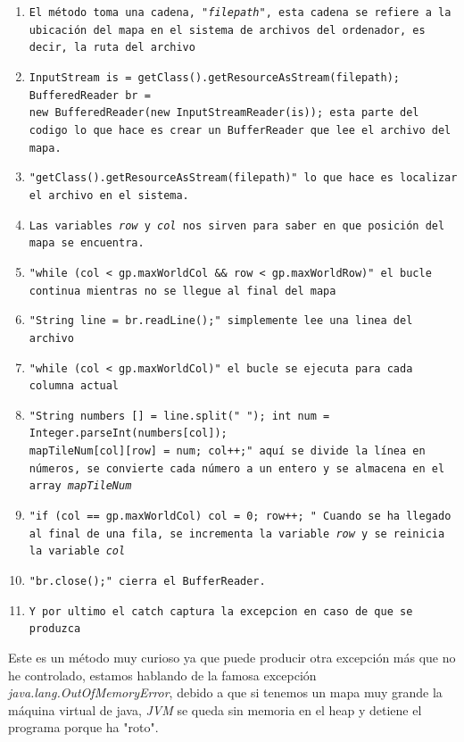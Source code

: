 \documentclass[a4paper]{article}
\begin{document}
\begin{enumerate}
    \item \texttt{El método toma una cadena, \textit{"filepath"}, esta cadena se refiere a la ubicación del mapa en el sistema de archivos del ordenador, es decir, la ruta del archivo}
    \item \texttt{InputStream is = getClass().getResourceAsStream(filepath); BufferedReader br = \\
    new BufferedReader(new InputStreamReader(is)); 
    esta parte del codigo lo que hace es crear un BufferReader que lee el archivo del mapa.}
    \item \texttt{"getClass().getResourceAsStream(filepath)" lo que hace es localizar el archivo en el sistema.}
    \item \texttt{Las variables \textit{row} y \textit{col} nos sirven para saber en que posición del mapa se encuentra.}
    \item \texttt{"while (col < gp.maxWorldCol \&\& row < gp.maxWorldRow)" el bucle continua mientras no se llegue al final del mapa}
    \item \texttt{"String line = br.readLine();" simplemente lee una linea del archivo}
    \item \texttt{"while (col < gp.maxWorldCol)" el bucle se ejecuta para cada columna actual}
    \item \texttt{"String numbers [] = line.split(" "); int num = Integer.parseInt(numbers[col]);\\ mapTileNum[col][row] = num; col++;" aquí se divide la línea en números, se convierte cada número a un entero y se almacena en el array \textit{mapTileNum}}
    \item \texttt{"if (col == gp.maxWorldCol){ col = 0; row++; }" Cuando se ha llegado al final de una fila, se incrementa la variable \textit{row} y se reinicia la variable \textit{col}}
    \item \texttt{"br.close();" cierra el BufferReader.}
    \item \texttt{Y por ultimo el catch captura la excepcion en caso de que se produzca}
\end{enumerate}
Este es un método muy curioso ya que puede producir otra excepción más que no he controlado, estamos hablando de la famosa excepción \textit{java.lang.OutOfMemoryError}, debido a que si tenemos un mapa muy grande
la máquina virtual de java, \textit{JVM} se queda sin memoria en el heap y detiene el programa porque ha "roto".
\clearpage
\end{document}
